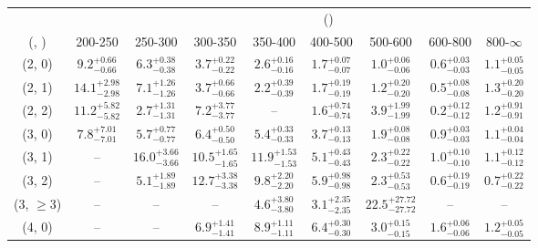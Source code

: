 \begin{table}[h!]
\tiny
\centering
{}
\begin{tabular}
{ccccccccc}
	\hline\hline
&	& \multicolumn{8}{c}{\scalht (\gev)} \\ 
	 (\njet,  \nb) & 200-250 & 250-300 & 300-350 & 350-400 & 400-500 & 500-600 & 600-800 & 800-$\infty$ \\ [0.8ex] 
\hline
	(2, 0) & $9.2^{+ 0.66 }_{- 0.66 }$ & $6.3^{+ 0.38 }_{- 0.38 }$ & $3.7^{+ 0.22 }_{- 0.22 }$ & $2.6^{+ 0.16 }_{- 0.16 }$ & $1.7^{+ 0.07 }_{- 0.07 }$ & $1.0^{+ 0.06 }_{- 0.06 }$ & $0.6^{+ 0.03 }_{- 0.03 }$ & $1.1^{+ 0.05 }_{- 0.05 }$ \\[0.5ex] 
	(2, 1) & $14.1^{+ 2.98 }_{- 2.98 }$ & $7.1^{+ 1.26 }_{- 1.26 }$ & $3.7^{+ 0.66 }_{- 0.66 }$ & $2.2^{+ 0.39 }_{- 0.39 }$ & $1.7^{+ 0.19 }_{- 0.19 }$ & $1.2^{+ 0.20 }_{- 0.20 }$ & $0.5^{+ 0.08 }_{- 0.08 }$ & $1.3^{+ 0.20 }_{- 0.20 }$ \\[0.5ex] 
	(2, 2) & $11.2^{+ 5.82 }_{- 5.82 }$ & $2.7^{+ 1.31 }_{- 1.31 }$ & $7.2^{+ 3.77 }_{- 3.77 }$ & -- & $1.6^{+ 0.74 }_{- 0.74 }$ & $3.9^{+ 1.99 }_{- 1.99 }$ & $0.2^{+ 0.12 }_{- 0.12 }$ & $1.2^{+ 0.91 }_{- 0.91 }$ \\[0.5ex] 
	(3, 0) & $7.8^{+ 7.01 }_{- 7.01 }$ & $5.7^{+ 0.77 }_{- 0.77 }$ & $6.4^{+ 0.50 }_{- 0.50 }$ & $5.4^{+ 0.33 }_{- 0.33 }$ & $3.7^{+ 0.13 }_{- 0.13 }$ & $1.9^{+ 0.08 }_{- 0.08 }$ & $0.9^{+ 0.03 }_{- 0.03 }$ & $1.1^{+ 0.04 }_{- 0.04 }$ \\[0.5ex] 
	(3, 1) & -- & $16.0^{+ 3.66 }_{- 3.66 }$ & $10.5^{+ 1.65 }_{- 1.65 }$ & $11.9^{+ 1.53 }_{- 1.53 }$ & $5.1^{+ 0.43 }_{- 0.43 }$ & $2.3^{+ 0.22 }_{- 0.22 }$ & $1.0^{+ 0.10 }_{- 0.10 }$ & $1.1^{+ 0.12 }_{- 0.12 }$ \\[0.5ex] 
	(3, 2) & -- & $5.1^{+ 1.89 }_{- 1.89 }$ & $12.7^{+ 3.38 }_{- 3.38 }$ & $9.8^{+ 2.20 }_{- 2.20 }$ & $5.9^{+ 0.98 }_{- 0.98 }$ & $2.3^{+ 0.53 }_{- 0.53 }$ & $0.6^{+ 0.19 }_{- 0.19 }$ & $0.7^{+ 0.22 }_{- 0.22 }$ \\[0.5ex] 
	(3, $\ge3$) & -- & -- & -- & $4.6^{+ 3.80 }_{- 3.80 }$ & $3.1^{+ 2.35 }_{- 2.35 }$ & $22.5^{+ 27.72 }_{- 27.72 }$ & -- & -- \\[0.5ex] 
	(4, 0) & -- & -- & $6.9^{+ 1.41 }_{- 1.41 }$ & $8.9^{+ 1.11 }_{- 1.11 }$ & $6.4^{+ 0.30 }_{- 0.30 }$ & $3.0^{+ 0.15 }_{- 0.15 }$ & $1.6^{+ 0.06 }_{- 0.06 }$ & $1.2^{+ 0.05 }_{- 0.05 }$ \\[0.5ex] 

\end{tabular}
\end{table}
